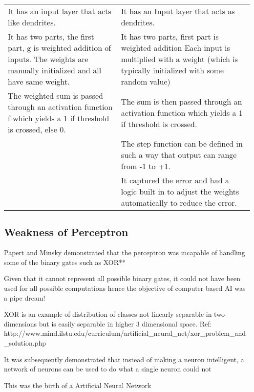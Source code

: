 	\begin{topcaptiontable}
        \centering
        \lecaption{}
        \label{tab:}
		\begin{tabular}{|p{0.5\qandatextwidth-2\tabcolsep}|p{0.5\qandatextwidth-2\tabcolsep}|} \hline
				\tablecolumnheadervlinesone{McCulloch-Pitts Neuron} & \tablecolumnheadervlinestwo{Rosenblatt's Perceptron} \\ \hline
				It has an input layer that acts like dendrites. &
				It has an Input layer that acts as dendrites. \\ \hline
				It has two parts, the first part, g is weighted addition of inputs. The weights are manually initialized and all have same weight. &
				It has two parts, first part is weighted addition Each input is multiplied with a weight (which is typically initialized with some random value) \\ \hline
				The weighted sum is passed through an activation function f which yields a 1 if threshold is crossed, else 0. &
				The sum is then passed through an activation function which yields a 1 if threshold is crossed. \\ \hline
				&
				The step function can be defined in such a way that output can range from -1 to +1. \\ \hline
				&
				It captured the error and had a logic built in to adjust the weights automatically to reduce the error. \\ \hline
		\end{tabular}
	\end{topcaptiontable}

	\subsection{Weakness of Perceptron}
	\begin{bulletedlist}
		\item Papert and Minsky demonstrated that the perceptron was incapable of handling some of the binary gates such as XOR**
		\item Given that it cannot represent all possible binary gates, it could not have been used for all possible computations hence the objective of computer based AI was a pipe dream!
		\item XOR is an example of distribution of classes not linearly separable in two dimensions but is easily separable in higher 3 dimensional space. Ref: http://www.mind.ilstu.edu/curriculum/artificial\_neural\_net/xor\_problem\_and\_solution.php
		\item It was subsequently demonstrated that instead of making a neuron intelligent, a network of neurons can be used to do what a single neuron could not
		\item This was the birth of a Artificial Neural Network
	\end{bulletedlist}


